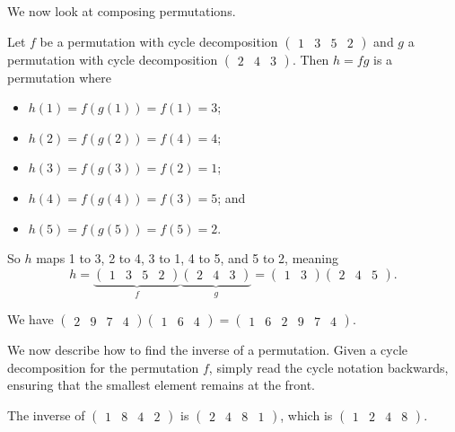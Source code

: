 We now look at composing permutations.
\begin{example}
    Let $f$ be a permutation with cycle decomposition $\begin{pmatrix}1 & 3 & 5 & 2\end{pmatrix}$ and $g$ a permutation with cycle decomposition $\begin{pmatrix}2 & 4 & 3\end{pmatrix}$. Then $h = fg$ is a permutation where
    \begin{itemize}
        \item $h(1) = f(g(1)) = f(1) = 3$;
        \item $h(2) = f(g(2)) = f(4) = 4$;
        \item $h(3) = f(g(3)) = f(2) = 1$;
        \item $h(4) = f(g(4)) = f(3) = 5$; and
        \item $h(5) = f(g(5)) = f(5) = 2$.
    \end{itemize}

    So $h$ maps 1 to 3, 2 to 4, 3 to 1, 4 to 5, and 5 to 2, meaning
    \[
        h = \underbrace{\begin{pmatrix}1 & 3 & 5 & 2\end{pmatrix}}_{f}\underbrace{\begin{pmatrix}2 & 4 & 3\end{pmatrix}}_{g} = \begin{pmatrix}1 & 3\end{pmatrix}\begin{pmatrix}2 & 4 & 5\end{pmatrix}.
    \]
\end{example}

\begin{example}
    We have $ \begin{pmatrix}2 & 9 & 7 & 4\end{pmatrix}\begin{pmatrix}1 & 6 & 4\end{pmatrix} = \begin{pmatrix}1 & 6 & 2 & 9 & 7 & 4\end{pmatrix}$.
\end{example}

We now describe how to find the inverse of a permutation. Given a cycle decomposition for the permutation $f$, simply read the cycle notation backwards, ensuring that the smallest element remains at the front.

\begin{example}
    The inverse of $\begin{pmatrix}1 & 8 & 4 & 2\end{pmatrix}$ is $\begin{pmatrix}2 & 4 & 8 & 1\end{pmatrix}$, which is $\begin{pmatrix}1 & 2 & 4 & 8\end{pmatrix}$.
\end{example}

